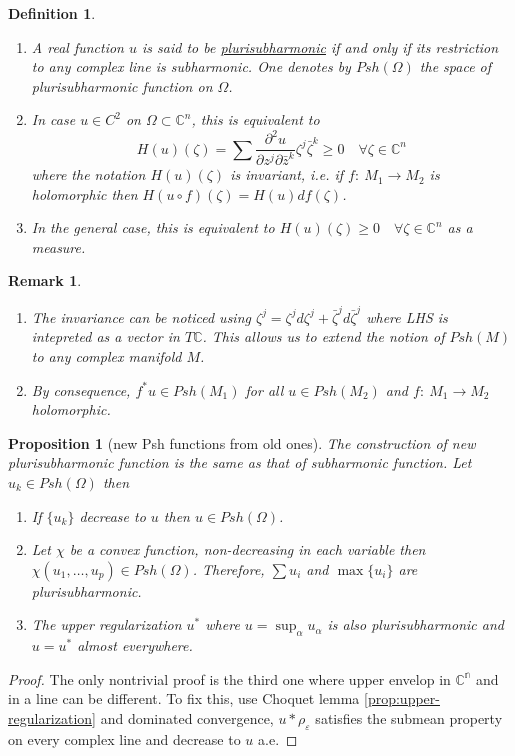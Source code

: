 \documentclass[11pt]{article}
\newtheorem{remark}{Remark}
\newtheorem{proposition}{Proposition}[theorem]
\newtheorem{definition}{Definition}
\begin{document}
\begin{definition}
\begin{enumerate}
\item A real function \(u\) is said to be \uline{plurisubharmonic} if and only if its restriction to
any complex line is subharmonic. One denotes by \(Psh(\Omega)\) the space of
plurisubharmonic function on \(\Omega\).
\item In case \(u\in C^2\) on \(\Omega\subset \mathbb{C}^n\), this is equivalent to \[ H(u)(\zeta) = \sum
   \frac{\partial^2 u}{\partial z^j \partial \bar z^k } \zeta^j \bar\zeta^k \geq 0\quad
   \forall \zeta\in \mathbb{C}^n \] where the notation \(H(u)(\zeta)\) is invariant,
i.e. if \(f:\ M_1 \longrightarrow M_2\) is holomorphic then \(H(u\circ f)(\zeta) = H(u) df(\zeta)\).
\item In the general case, this is equivalent to \(H(u)(\zeta) \geq 0\quad\forall \zeta\in
   \mathbb{C}^n\) as a measure.
\end{enumerate}
\end{definition}

\begin{remark}
\begin{enumerate}
\item The invariance can be noticed using \(\zeta^j = \zeta^j d\zeta^j + \bar\zeta^j
   d\bar\zeta^j\) where LHS is intepreted as a vector in \(T \mathbb{C}\). This allows
us to extend the notion of \(Psh(M)\) to any complex manifold \(M\).
\item By consequence, \(f^*u \in Psh(M_1)\) for all \(u\in Psh(M_2)\) and \(f:\ M_1
   \longrightarrow M_2\) holomorphic.
\end{enumerate}
\end{remark}

\begin{proposition}[new Psh functions from old ones]
The construction of new plurisubharmonic function is the same as that of subharmonic
function. Let \(u_k \in Psh(\Omega)\) then
\begin{enumerate}
\item If \(\{u_k\}\) decrease to \(u\) then \(u\in Psh(\Omega)\).
\item Let \(\chi\) be a convex function, non-decreasing in each variable then \(\chi(u_1,\dots,u_p) \in Psh(\Omega)\). Therefore, \(\sum u_i\) and \(\max\{u_i\}\)
are plurisubharmonic.
\item The upper regularization \(u^*\) where \(u = \sup_\alpha u_\alpha\) is also
plurisubharmonic and \(u=u^*\) almost everywhere.
\end{enumerate}
\end{proposition}
\begin{proof}
The only nontrivial proof is the third one where upper envelop in \(\mathbb{C^n}\) and
in a line can be different. To fix this, use Choquet lemma \ref{prop:upper-regularization} and dominated convergence, \(u*\rho_\varepsilon\) satisfies the submean property on every complex line and decrease to
\(u\) a.e.
\end{proof}
\end{document}
